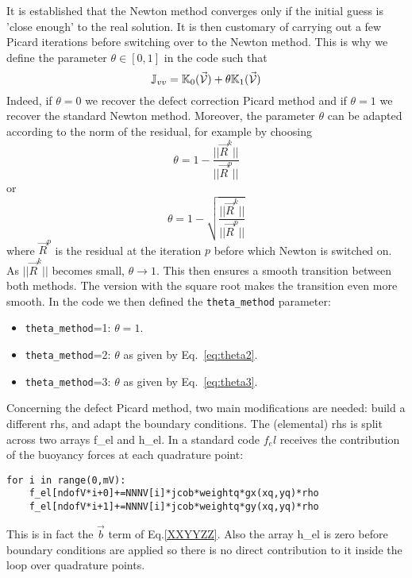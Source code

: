 It is established that the Newton method converges only if the initial guess is 'close enough'
to the real solution. It is then customary of carrying out a few Picard iterations 
before switching over to the Newton method. 
This is why we define the parameter $\theta\in[0,1]$ in the code such that 
\[
{\mathbb{J}}_{vv} = {\mathbb{K}}_0(\vec{\cal V})+\theta {\mathbb{K}}_1(\vec{\cal V})
\]
Indeed, if $\theta=0$ we recover the defect correction Picard method and
if $\theta=1$ we recover the standard Newton method. 
Moreover, the parameter $\theta$ can be adapted according to the norm of 
the residual, for example by choosing 
\begin{equation}
\theta = 1 - \frac{||\vec{R}^k||}{||\vec{R}^p||} 
\label{eq:theta2}
\end{equation}
or
\begin{equation}
\theta = 1 - \sqrt{\frac{||\vec{R}^k||}{||\vec{R}^p||}}
\label{eq:theta3}
\end{equation}
where $\vec{R}^p$ is the residual at the iteration $p$ before which Newton is switched on.
As $||\vec{R}^k||$ becomes small, $\theta \rightarrow 1$.
This then ensures a smooth transition between both methods. The version 
with the square root makes the transition even more smooth.
In the code we then defined the {\tt theta\_method} parameter:
\begin{itemize}
\item {\tt theta\_method}=1: $\theta=1$.
\item {\tt theta\_method}=2: $\theta$ as given by Eq.~\eqref{eq:theta2}.
\item {\tt theta\_method}=3: $\theta$ as given by Eq.~\eqref{eq:theta3}.
\end{itemize}


Concerning the defect Picard method, two main modifications 
are needed: build a different rhs, and adapt the boundary conditions. 
The (elemental) rhs is split across two arrays {\codefont f\_el} and {\codefont h\_el}.
In a standard code $f_el$ receives the contribution of the buoyancy forces at 
each quadrature point:
\begin{lstlisting}
for i in range(0,mV):
    f_el[ndofV*i+0]+=NNNV[i]*jcob*weightq*gx(xq,yq)*rho
    f_el[ndofV*i+1]+=NNNV[i]*jcob*weightq*gy(xq,yq)*rho
\end{lstlisting}
This is in fact the $\vec{b}$ term of Eq.\eqref{XXYYZZ}. 
Also the array {\codefont h\_el} is zero before boundary conditions are
applied so there is no direct contribution to it inside the loop over 
quadrature points.


